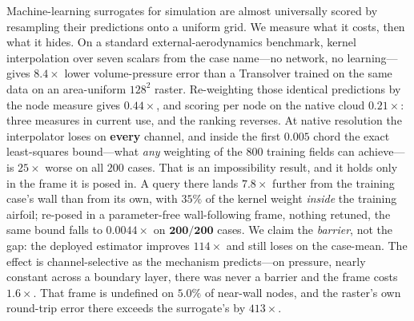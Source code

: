 Machine-learning surrogates for simulation are almost universally scored by resampling
their predictions onto a uniform grid. We measure what it costs, then what it hides. On a
standard external-aerodynamics benchmark, kernel interpolation over seven scalars from the
case name---no network, no learning---gives $8.4\times$ lower volume-pressure error than a
Transolver trained on the same data on an area-uniform $128^2$ raster. Re-weighting those
identical predictions by the node measure gives $0.44\times$, and scoring per node on the
native cloud $0.21\times$: three measures in current use, and the ranking reverses. At
native resolution the interpolator loses on \textbf{every} channel, and inside the first
$0.005$ chord the exact least-squares bound---what \emph{any} weighting of the $800$
training fields can achieve---is $25\times$ worse on all $200$ cases. That is an
impossibility result, and it holds only in the frame it is posed in. A query there lands
$7.8\times$ further from the training case's wall than from its own, with $35\%$ of the
kernel weight \emph{inside} the training airfoil; re-posed in a parameter-free
wall-following frame, nothing retuned, the same bound falls to $\mathbf{0.0044\times}$ on
$\mathbf{200/200}$ cases. We claim the \emph{barrier}, not the gap: the deployed estimator
improves $114\times$ and still loses on the case-mean. The effect is channel-selective as
the mechanism predicts---on pressure, nearly constant across a boundary layer, there was
never a barrier and the frame costs $1.6\times$. That frame is undefined on $5.0\%$ of
near-wall nodes, and the raster's own round-trip error there exceeds the surrogate's by
$413\times$.
